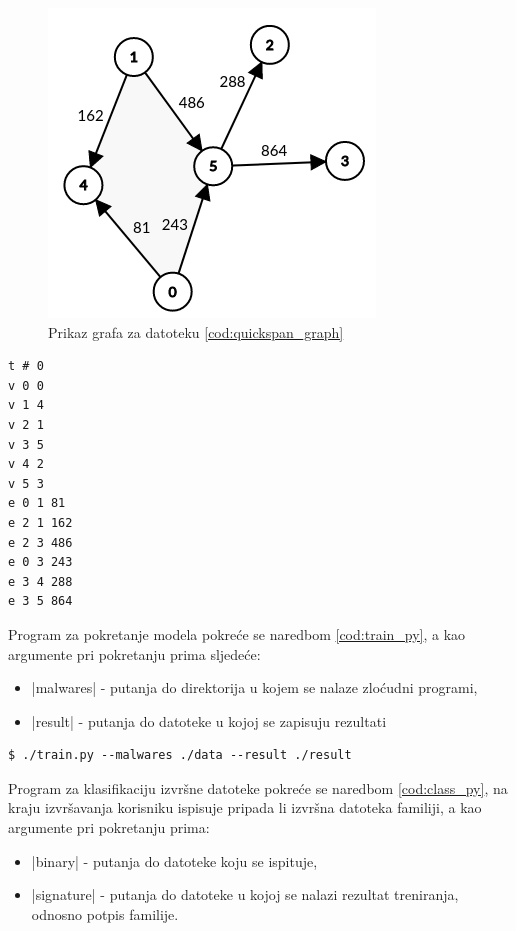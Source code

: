 \begin{figure}[htb]
    \centering
    \includegraphics[scale=0.75]{images/quickspan_graph.png}
    \caption{Prikaz grafa za datoteku \ref{cod:quickspan_graph}}
    \label{fig:quickSpan_graph}
\end{figure}

\newpage

\begin{lstlisting}[caption={Primjer ulazne datoteke koja predstavlja graf},label={cod:quickspan_graph}]
t # 0
v 0 0
v 1 4
v 2 1
v 3 5
v 4 2
v 5 3
e 0 1 81
e 2 1 162
e 2 3 486
e 0 3 243
e 3 4 288
e 3 5 864
\end{lstlisting}

Program za pokretanje modela pokreće se naredbom \ref{cod:train_py}, a kao
argumente pri pokretanju prima sljedeće:
\begin{itemize}
    \item \inlinecode|malwares| - putanja do direktorija u kojem se nalaze zloćudni
    programi,
    \item \inlinecode|result| - putanja do datoteke u kojoj se zapisuju rezultati
\end{itemize}

\begin{lstlisting}[caption={Pokretanje treniranja},label={cod:train_py}]
    $ ./train.py --malwares ./data --result ./result
\end{lstlisting}

Program za klasifikaciju izvršne datoteke pokreće se naredbom 
\ref{cod:class_py}, na kraju izvršavanja korisniku ispisuje pripada li izvršna
datoteka familiji, a kao argumente pri pokretanju prima:
\begin{itemize}
    \item \inlinecode|binary| - putanja do datoteke koju se ispituje,
    \item \inlinecode|signature| - putanja do datoteke u kojoj se nalazi
    rezultat treniranja, odnosno potpis familije.
\end{itemize}


